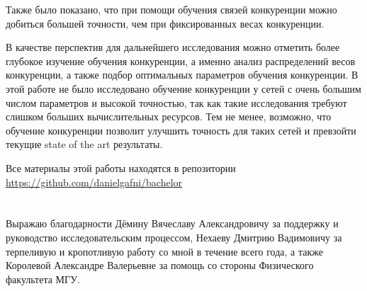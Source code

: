 \documentclass[a4paper]{article}
\begin{document}
Также было показано, что при помощи обучения связей конкуренции можно добиться большей точности, чем при фиксированных весах конкуренции.

В качестве перспектив для дальнейшего исследования можно отметить более глубокое изучение обучения конкуренции, а именно анализ распределений весов конкуренции, а также подбор оптимальных параметров обучения конкуренции. В этой работе не было исследовано обучение конкуренции у сетей с очень большим числом параметров и высокой точностью, так как такие исследования требуют слишком больших вычислительных ресурсов. Тем не менее, возможно, что обучение конкуренции позволит улучшить точность для таких сетей и превзойти текущие state of the art результаты.

\begin{center}
Все материалы этой работы находятся в репозитории\\
\href{https://github.com/danielgafni/bachelor}{https://github.com/danielgafni/bachelor} 
\end{center}

\clearpage 
 

\section{}
Выражаю благодарности Дёмину Вячеславу Александровичу за поддержку и руководство исследовательским процессом, Нехаеву Дмитрию Вадимовичу за терпеливую и кропотливую работу со мной в течение всего года, а также Королевой Александре Валерьевне за помощь со стороны Физического факультета МГУ.

\clearpage

\printbibliography
\end{document}
